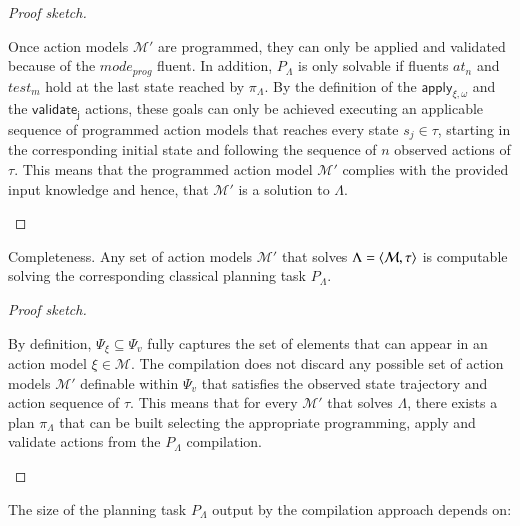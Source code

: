 \begin{proof}[Proof sketch]
\begin{small}
  Once action models $\mathcal{M}'$ are programmed, they can only be applied and validated because of the $mode_{prog}$ fluent. In addition, $P_{\Lambda}$ is only solvable if fluents {\tt\small $at_n$} and {\tt\small $test_m$} hold at the last state reached by $\pi_\Lambda$. By the definition of the $\mathsf{apply_{\xi,\omega}}$ and the $\mathsf{validate_{j}}$ actions, these goals can only be achieved executing an applicable sequence of programmed action models that reaches every state $s_j\in\tau$, starting in the corresponding initial state and following the sequence of $n$ observed actions of $\tau$. This means that the programmed action model $\mathcal{M}'$ complies with the provided input knowledge and hence, that $\mathcal{M}'$ is a solution to $\Lambda$.
\end{small}
\end{proof}


\begin{mylemma}
Completeness. Any set of action models $\mathcal{M}'$ that solves $\Lambda={\langle \mathcal{M},\tau \rangle}$ is computable solving the corresponding classical planning task $P_{\Lambda}$.
\end{mylemma}

\begin{proof}[Proof sketch]
\begin{small}
  By definition, $\Psi_{\xi}\subseteq \Psi_v$ fully captures the set of elements that can appear in an action model $\xi\in\mathcal{M}$. The compilation does not discard any possible set of action models $\mathcal{M}'$ definable within $\Psi_v$ that satisfies the observed state trajectory and action sequence of $\tau$. This means that for every $\mathcal{M}'$ that solves $\Lambda$, there exists a plan $\pi_\Lambda$ that can be built selecting the appropriate programming, apply and validate actions from the $P_{\Lambda}$ compilation.
\end{small}
\end{proof}

The size of the planning task $P_{\Lambda}$ output by the compilation approach depends on:

